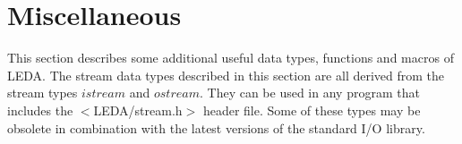 \chapter{Miscellaneous} \label{Miscellaneous}

This section describes some additional useful data types, functions and
macros of LEDA. 
The stream data types described in this section are all derived from
the \CC stream types $istream$ and $ostream$. They can be used in any 
program that includes the $<$LEDA/stream.h$>$ header file. Some of these types 
may be obsolete in combination with the latest versions of the 
standard \CC I/O library.


\newpage

\newpage

\newpage

\newpage

\newpage

